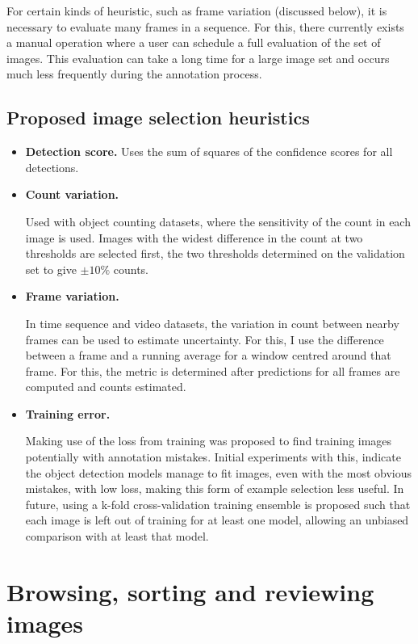 For certain kinds of heuristic, such as frame variation (discussed below), it is necessary to evaluate many frames in a sequence. For this, there currently exists a manual operation where a user can schedule a full evaluation of the set of images. This evaluation can take a long time for a large image set and occurs much less frequently during the annotation process.


\subsection {Proposed image selection heuristics}
\begin{itemize}
\item {\bf Detection score. }
Uses the sum of squares of the confidence scores for all detections. 

    \item {\bf Count variation. } \par
Used with object counting datasets, where the sensitivity of the count in each image is used. Images with the widest difference in the count at two thresholds are selected first, the two thresholds determined on the validation set to give $ \pm 10\% $ counts.
    \item {\bf Frame variation. }  \par
In time sequence and video datasets, the variation in count between nearby frames can be used to estimate uncertainty. For this, I use the difference between a frame and a running average for a window centred around that frame. For this, the metric is determined after predictions for all frames are computed and counts estimated.
    \item {\bf Training error. }  \par
Making use of the loss from training was proposed to find training images potentially with annotation mistakes. Initial experiments with this, indicate the object detection models manage to fit images, even with the most obvious mistakes, with low loss, making this form of example selection less useful. In future, using a k-fold cross-validation training ensemble is proposed such that each image is left out of training for at least one model, allowing an unbiased comparison with at least that model.
\end{itemize}


\section{Browsing, sorting and reviewing images}
\label{sec:browising}


